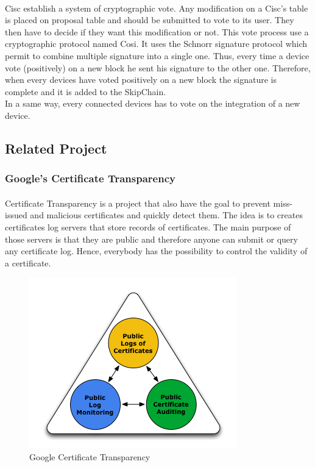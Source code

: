 \documentclass[11pt, a4paper, twoside, openright]{article}
\begin{document}
\paragraph{}Cisc establish a system of cryptographic vote. Any modification on a Cisc's table is placed on proposal table and should be submitted to vote to its user. They then have to decide if they want this modification or not. This vote process use a cryptographic protocol named Cosi. It uses the Schnorr signature protocol which permit to combine multiple signature into a single one. Thus, every time a device vote (positively) on a new block he sent his signature to the other one. Therefore, when every devices have voted positively on a new block the signature is complete and it is added to the SkipChain.      
\\In a same way, every connected devices has to vote on the integration of a new device.
\subsection{Related Project}
\subsubsection{Google's Certificate Transparency}
\paragraph{}  Certificate Transparency is a project that also have the goal to prevent miss-issued and malicious certificates and quickly detect them.
The idea is to creates certificates log servers that store records of certificates. The main purpose of those servers is that they are public and therefore anyone can submit or query any certificate log. Hence, everybody has the possibility to control the validity of a certificate.
\begin{figure}[h]
   \centering
   \includegraphics[scale=0.5]{Google_Cert_trans.png}
   \caption{Google Certificate Transparency}
\end{figure}
\end{document}
